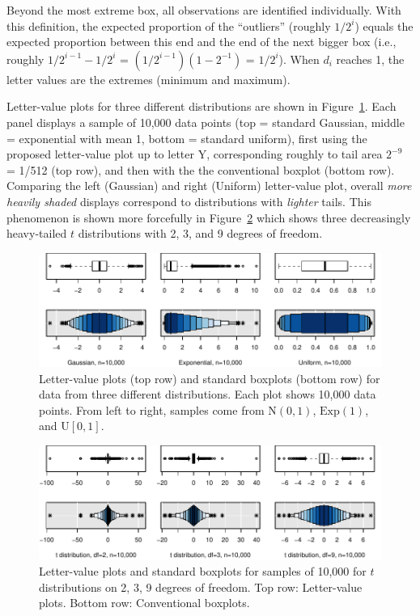 \documentclass[12pt,oneside]{article}
\begin{document}
Beyond the most extreme box, all observations are identified individually. With this definition, the expected proportion of the ``outliers'' (roughly $1/2^i$) equals the expected proportion between this end and the end of the next bigger box (i.e., roughly $1/2^{i-1} - 1/2^i$ = $(1/2^{i-1})(1 - 2^{-1})$ = $1 / 2^i$). When $d_i$ reaches 1, the letter values are the extremes (minimum and maximum).

Letter-value plots for three different distributions are shown in Figure~\ref{stackbox}. Each panel displays a sample of 10,000 data points (top = standard Gaussian, middle = exponential with mean 1, bottom = standard uniform), first using the proposed letter-value plot up to letter Y, corresponding roughly to tail area $2^{-9}$ = 1/512 (top row), and then with the the conventional boxplot (bottom row). Comparing the left (Gaussian) and right (Uniform) letter-value plot, overall \textit{more heavily shaded} displays correspond to distributions with \textit{lighter} tails. This phenomenon is shown more forcefully in Figure~\ref{t-dist} which shows three decreasingly heavy-tailed $t$ distributions with 2, 3, and 9 degrees of freedom.

\begin{figure}[hbtp]
  \centering
  \includegraphics[width = \linewidth]{boxplots}

  \caption{Letter-value plots (top row) and standard boxplots (bottom row) for
  data from three different distributions. Each plot shows 10,000 data points.
  From left to right, samples come from $\mbox{N}(0,1)$, $\mbox{Exp}(1)$, and
  $\mbox{U}[0,1]$. }

  \label{stackbox}
\end{figure}

\begin{figure}[hbtp]
  \centering
  \includegraphics[width = \linewidth]{t-dist}
  
  \caption{Letter-value plots and standard boxplots for samples of 10,000
  for $t$ distributions on 2, 3, 9 degrees of freedom. Top row: Letter-value
  plots. Bottom row: Conventional boxplots.}
  \label{t-dist}
\end{figure}
\end{document}
